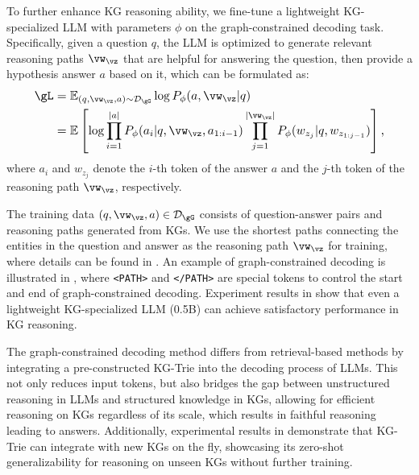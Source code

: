 To further enhance KG reasoning ability, we fine-tune a lightweight KG-specialized LLM with parameters $\phi$ on the graph-constrained decoding task. Specifically, given a question $q$, the LLM is optimized to generate relevant reasoning paths $\vw_\vz$ that are helpful for answering the question, then provide a hypothesis answer $a$ based on it, which can be formulated as:
\begin{equation}
    \resizebox{.9\columnwidth}{!}{$
    \begin{aligned}
    \gL &= \mathbb{E}_{(q, \vw_\vz, a) \sim \mathcal{D_\gG}} \log P_\phi(a, \vw_\vz | q) \\
    & = \mathbb{E}\left[ \log \prod_{i=1}^{|a|} P_\phi(a_i|q, \vw_\vz, a_{1:i-1}) \prod_{j=1}^{|\vw_\vz|} P_\phi(w_{z_j}|q, w_{z_{1:j-1}})\right],
    \end{aligned}
    $}
\end{equation}
where $a_i$ and $w_{z_j}$ denote the $i$-th token of the answer $a$ and the $j$-th token of the reasoning path $\vw_\vz$, respectively.

The training data $(q, \vw_\vz, a) \in \mathcal{D_\gG}$ consists of question-answer pairs and reasoning paths generated from KGs. We use the shortest paths connecting the entities in the question and answer as the reasoning path $\vw_\vz$ for training, where details can be found in .
%
An example of graph-constrained decoding is illustrated in , where \texttt{<PATH>} and \texttt{</PATH>} are special tokens to control the start and end of graph-constrained decoding. Experiment results in  show that even a lightweight KG-specialized LLM (0.5B) can achieve satisfactory performance in KG reasoning.

The graph-constrained decoding method differs from retrieval-based methods by integrating a pre-constructed KG-Trie into the decoding process of LLMs. This not only reduces input tokens, but also bridges the gap between unstructured reasoning in LLMs and structured knowledge in KGs, allowing for efficient reasoning on KGs regardless of its scale, which results in faithful reasoning leading to answers. 
Additionally, experimental results in  demonstrate that KG-Trie can integrate with new KGs on the fly, showcasing its zero-shot generalizability for reasoning on unseen KGs without further training.

